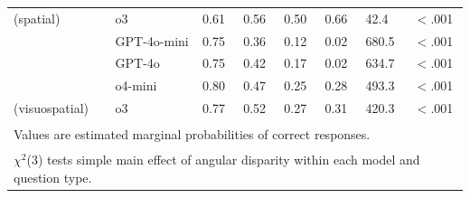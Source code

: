 \begin{table}[!h]
{\begin{tabular}[t]{llllllll}
\multirow[t]{-4}{*}{\raggedright\arraybackslash 2 (spatial)} & o3 & 0.61 & 0.56 & 0.50 & 0.66 & 42.4 & $<$.001\\

 & GPT-4o-mini & 0.75 & 0.36 & 0.12 & 0.02 & 680.5 & $<$.001\\

 & GPT-4o & 0.75 & 0.42 & 0.17 & 0.02 & 634.7 & $<$.001\\

 & o4-mini & 0.80 & 0.47 & 0.25 & 0.28 & 493.3 & $<$.001\\

\multirow[t]{-4}{*}{\raggedright\arraybackslash 3 (visuospatial)} & o3 & 0.77 & 0.52 & 0.27 & 0.31 & 420.3 & $<$.001\\
\bottomrule
\multicolumn{8}{l}{\textsuperscript{} Values are estimated marginal probabilities of correct responses.}\\
\multicolumn{8}{l}{\textsuperscript{} $\chi^2$(3) tests simple main effect of angular disparity within each model and question type.}\\
\end{tabular}}
\end{table}
